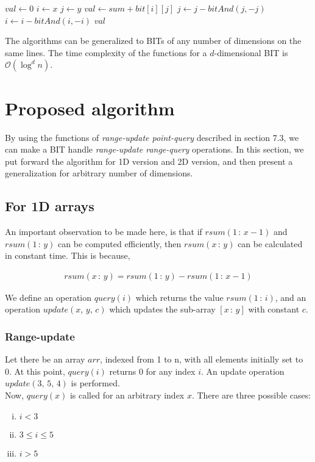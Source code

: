 \documentclass[a4paper]{article}
\begin{document}
\vspace {3 mm}
\noindent
{}
\begin{algorithmic}[1]

        \State $val \gets 0$
        \State $i \gets x$
            \State $j \gets y$
                \State $val \gets sum + bit[i][j]$
                \State $j \gets j - bitAnd(j, -j)$
            \EndWhile
            \State $i \gets i - bitAnd(i, -i)$
        \EndWhile
        \State \Return $val$
\EndFunction
\end{algorithmic}

\vspace{3 mm}
The algorithms can be generalized to BITs of any number of dimensions on the same lines. The time complexity of the functions for a $d$-dimensional BIT is $\mathcal{O}(\log^d n)$.



\section{Proposed algorithm}
By using the functions of \textit{range-update point-query} described in section 7.3, we can make a BIT handle \textit{range-update range-query} operations. In this section, we put forward the algorithm for 1D version and 2D version, and then present a generalization for arbitrary number of dimensions.



\subsection{For 1D arrays}
An important observation to be made here, is that if $rsum(1 \,:\, x-1)$ and $rsum(1\, :\, y)$ can be computed efficiently, then $rsum(x\, :\, y)$ can be calculated in constant time. This is because,

\vspace{-5 mm}
\begin{align}
rsum(x\, :\, y) = rsum(1\, :\, y)-rsum(1\, :\, x-1)
\end{align}

We define an operation $query(i)$ which returns the value $rsum(1\, : \,i)$, and an operation $update(x,\, y,\, c)$ which updates the sub-array $[x\, :\, y]$ with constant $c$.

\subsubsection{Range-update}
Let there be an array $arr$, indexed from 1 to n, with all elements initially set to 0. At this point, $query(i)$ returns 0 for any index $i$. An update operation $update(3,\, 5,\, 4)$ is performed.\\
Now, $query(x)$ is called for an arbitrary index $x$. There are three possible cases:
\begin{enumerate}[i.]
\vspace{-2 mm}
\item $i < 3$
\item $3 \leq i \leq 5$
\item $i > 5$
\end{enumerate}
\end{document}
